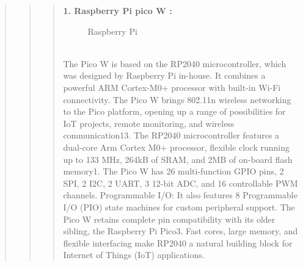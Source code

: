 \documentclass[12pt]{report}
\begin{document}
\begin{quote}
		
		\clearpage
		
		\begin{quote}
			
			\begin{quote}
				\textbf{1. Raspberry Pi pico W :}
				\begin{figure}[h]
					\centering
					\caption{Raspberry Pi }
					
					\!
					\!
				\end{figure}
				\\The Pico W is based on the RP2040 microcontroller, which was designed by Raspberry Pi in-house. It combines a powerful ARM Cortex-M0+ processor with built-in Wi-Fi connectivity. The Pico W brings 802.11n wireless networking to the Pico platform, opening up a range of possibilities for IoT projects, remote monitoring, and wireless communication13. The RP2040 microcontroller features a dual-core Arm Cortex M0+ processor, flexible clock running up to 133 MHz, 264kB of SRAM, and 2MB of on-board flash memory1. The Pico W has 26 multi-function GPIO pins, 2 SPI, 2 I2C, 2 UART, 3 12-bit ADC, and 16 controllable PWM channels.
				Programmable I/O: It also features 8 Programmable I/O (PIO) state machines for custom peripheral support. The Pico W retains complete pin compatibility with its older sibling, the Raspberry Pi Pico3. Fast cores, large memory, and flexible interfacing make RP2040 a natural building block for Internet of Things (IoT) applications.
				
				
			\end{quote}
			

\end{quote}
\end{quote}
\end{document}
